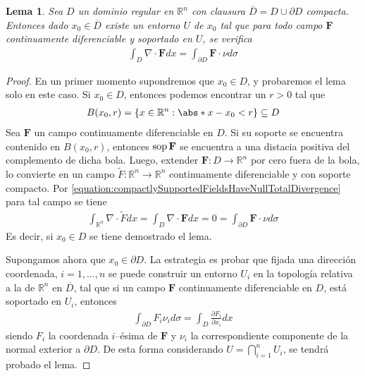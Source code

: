 \documentclass{report}
\newcommand{\realNumbers}{\mathbb{R}}
\newtheorem{lemma}{Lema}
\theoremstyle{definition}
\theoremstyle{remark}
\DeclareMathOperator{\support}{\textnormal{sop}}
\begin{document}
  \begin{lemma}
    \label{lemma:localDivergenceTheorem}
    Sea \(D\) un dominio regular en \(\realNumbers^n\) con clausura \(\overline{D} = D \cup \partial D\) compacta.
    Entonces dado \(x_0 \in \overline{D}\) existe un entorno \(U\) de \(x_0\) tal que para todo campo \(\mathbf{F}\) continuamente diferenciable y soportado en \(U\), se verifica
    \begin{align}
      \int_D \nabla \cdot \mathbf{F} d x
      =
      \int_{\partial D} \mathbf{F} \cdot \nu d \sigma
    \end{align}
  \end{lemma}
  \begin{proof}
    En un primer momento supondremos que \(x_0 \in D\), y probaremos el lema solo en este caso.
    Si \(x_0 \in D\), entonces podemos encontrar un \(r > 0\) tal que 
    \begin{align}
      B(x_0, r)
      =
      \{
        x \in \realNumbers^n : \abs*{x - x_0} < r
      \}
      \subseteq
      D
    \end{align}
    Sea \(\mathbf{F}\) un campo continuamente diferenciable en \(D\).
    Si su soporte se encuentra contenido en \(B(x_0, r)\), entonces \(\support \mathbf{F}\) se encuentra a una distacia positiva del complemento de dicha bola.
    Luego, extender \(\mathbf{F} : D \rightarrow \realNumbers^n\) por cero fuera de la bola, lo convierte en un campo \(\tilde{F} : \realNumbers^n \rightarrow \realNumbers^n\) continuamente diferenciable y con soporte compacto.
    Por \eqref{equation:compactlySupportedFieldsHaveNullTotalDivergence} para tal campo se tiene
    \begin{align}
      \int_{\realNumbers^n} \nabla \cdot \tilde{F} dx
      =
      \int_D \nabla \cdot \mathbf{F} dx
      =
      0
      =
      \int_{\partial D} \mathbf{F} \cdot \nu d \sigma
    \end{align}
    Es decir, si \(x_0 \in D\) se tiene demostrado el lema.

    Supongamos ahora que \(x_0 \in \partial D\).
    La estrategia es probar que fijada una dirección coordenada, \(i = 1, \dots, n\) se puede construir un entorno \(U_i\) en la topología relativa a la de \(\realNumbers^n\) en \(\overline{D}\), tal que si un campo \(\mathbf{F}\) continuamente diferenciable en \(D\), está soportado en \(U_i\), entonces
    \begin{align}
      \label{equation:divergenceTheoremInTheIthDirection}
      \int_{\partial D}
        F_i \nu_i
      d \sigma
      =
      \int_D
        \frac{\partial F_i}{\partial x_i}
      dx
    \end{align}
    siendo \(F_i\) la coordenada \(i\)--ésima de \(\mathbf{F}\) y \(\nu_i\) la correspondiente componente de la normal exterior a \(\partial D\).
    De esta forma considerando \(U = \bigcap_{i = 1}^n U_i\), se tendrá probado el lema.


\end{proof}
\end{document}
